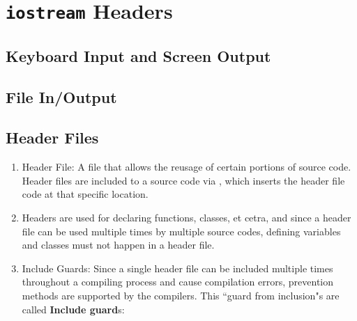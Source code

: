 \chapter{\texttt{iostream} Headers}

\section{Keyboard Input and Screen Output}

\section{File In/Output}

\section{Header Files}
\begin{enumerate}
\item Header File: A file that allows the reusage of certain portions of source
    code. Header files are included to a source code via , which
    inserts the header file code at that specific location.
\item Headers are used for declaring functions, classes, et cetra, and since a
    header file can be used multiple times by multiple source codes, defining
    variables and classes must not happen in a header file.
\item Include Guards: Since a single header file can be included multiple times
    throughout a compiling process and cause compilation errors, prevention
    methods are supported by the compilers. This ``guard from inclusion"s are
    called \textbf{Include guard}s: 
\end{enumerate}
